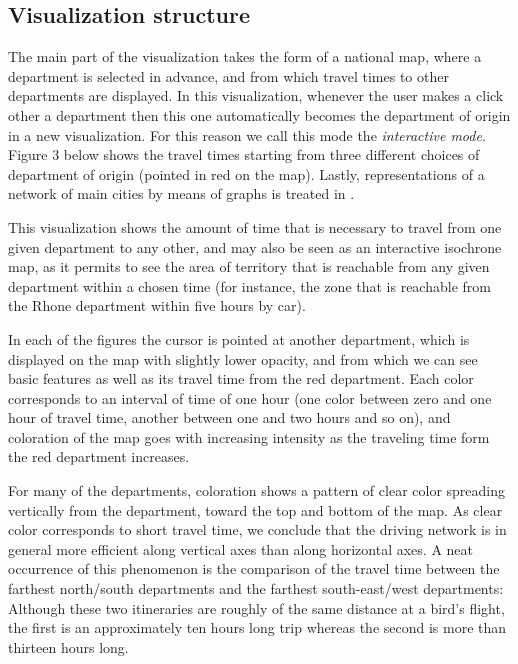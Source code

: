\documentclass{vgtc}                          %
\begin{document}
\subsection{Visualization structure}




  
The main part of the visualization takes the form of a national map, where a department is selected in advance, and from which travel times to other departments are displayed. In this visualization, whenever the user makes a click other a department then this one automatically becomes the department of origin in a new visualization. For this reason we call this mode the \textit{interactive mode}. Figure 3 below shows the travel times starting from three different choices of department of origin (pointed in red on the map). Lastly, representations of a network of main cities by means of graphs is treated in \cite{Gleyze}.


This visualization shows the amount of time that is necessary to travel from one given department to any other, and may also be seen as an interactive isochrone map, as it permits to see the area of territory that is reachable from any given department within a chosen time (for instance, the zone that is reachable from the Rhone department within five hours by car).

In each of the figures the cursor is pointed at another department, which is displayed on the map with slightly lower opacity, and from which we can see basic features as well as its travel time from the red department. Each color corresponds to an interval of time of one hour (one color between zero and one hour of travel time, another between one and two hours and so on), and coloration of the map goes with increasing intensity as the traveling time form the red department increases. 


For many of the departments, coloration shows a pattern of clear color  spreading vertically from the department, toward the top and bottom of the map. As clear color corresponds to short travel time, we conclude that the driving network is in general more efficient along vertical axes than along horizontal axes. A neat occurrence of this phenomenon is the comparison of the travel time between the farthest north/south departments and the farthest south-east/west departments: Although these two itineraries are roughly of the same distance at a bird's flight, the first is an approximately ten hours long trip whereas the second is more than thirteen hours long.\\
\end{document}
